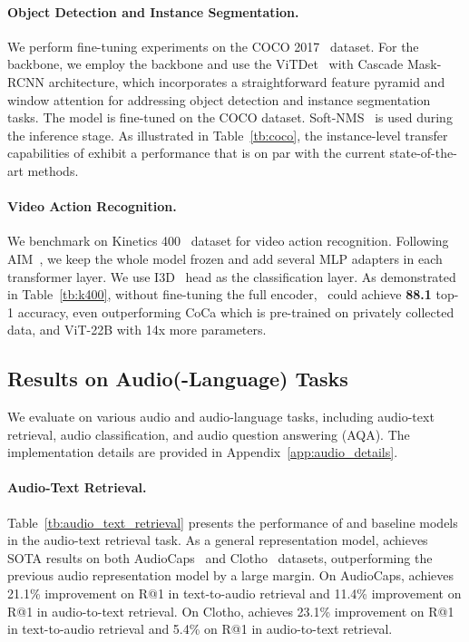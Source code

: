 \paragraph{Object Detection and Instance Segmentation.} We perform fine-tuning experiments on the COCO 2017~\cite{mscoco} dataset. For the backbone, we employ the \onepeace backbone and use the ViTDet~\cite{vitdet} with Cascade Mask-RCNN architecture, which incorporates a straightforward feature pyramid and window attention for addressing object detection and instance segmentation tasks. The model is fine-tuned on the COCO dataset. Soft-NMS~\cite{softnms} is used during the inference stage. As illustrated in Table~\ref{tb:coco}, the instance-level transfer capabilities of \onepeace exhibit a performance that is on par with the current state-of-the-art methods. 

\paragraph{Video Action Recognition.} We benchmark \onepeace on Kinetics 400~\cite{k400} dataset for video action recognition. Following AIM~\cite{aim}, we keep the whole model frozen and add several MLP adapters in each transformer layer. We use I3D~\cite{k400} head as the classification layer. As demonstrated in Table~\ref{tb:k400}, without fine-tuning the full encoder, ~\onepeace could achieve \textbf{88.1} top-1 accuracy, even outperforming CoCa which is pre-trained on privately collected data, and ViT-22B with 14x more parameters.

\subsection{Results on Audio(-Language) Tasks}

We evaluate \onepeace on various audio and audio-language tasks, including audio-text retrieval, audio classification, and audio question answering (AQA).
The implementation details are provided in Appendix~\ref{app:audio_details}.

\paragraph{Audio-Text Retrieval.}
Table~\ref{tb:audio_text_retrieval} presents the performance of \onepeace and baseline models in the audio-text retrieval task.
As a general representation model, \onepeace achieves SOTA results on both AudioCaps~\cite{audiocaps} and Clotho~\cite{clotho} datasets, outperforming the previous audio representation model by a large margin.
On AudioCaps, \onepeace achieves 21.1\% improvement on R@1 in text-to-audio retrieval and 11.4\% improvement on R@1 in audio-to-text retrieval.
On Clotho, \onepeace achieves 23.1\% improvement on R@1 in text-to-audio retrieval and 5.4\% on R@1 in audio-to-text retrieval.


